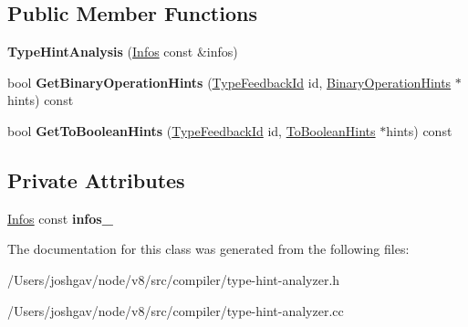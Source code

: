\subsection*{Public Member Functions}
\begin{DoxyCompactItemize}
\item 
{\bfseries Type\+Hint\+Analysis} (\hyperlink{classv8_1_1internal_1_1_zone_map}{Infos} const \&infos)\hypertarget{classv8_1_1internal_1_1compiler_1_1_type_hint_analysis_ae75e34763f2debfd8660e951d06e7c3e}{}\label{classv8_1_1internal_1_1compiler_1_1_type_hint_analysis_ae75e34763f2debfd8660e951d06e7c3e}

\item 
bool {\bfseries Get\+Binary\+Operation\+Hints} (\hyperlink{classv8_1_1internal_1_1_type_feedback_id}{Type\+Feedback\+Id} id, \hyperlink{classv8_1_1internal_1_1compiler_1_1_binary_operation_hints}{Binary\+Operation\+Hints} $\ast$hints) const \hypertarget{classv8_1_1internal_1_1compiler_1_1_type_hint_analysis_aba9dc0a1797e59bc3a49a2a8342f7773}{}\label{classv8_1_1internal_1_1compiler_1_1_type_hint_analysis_aba9dc0a1797e59bc3a49a2a8342f7773}

\item 
bool {\bfseries Get\+To\+Boolean\+Hints} (\hyperlink{classv8_1_1internal_1_1_type_feedback_id}{Type\+Feedback\+Id} id, \hyperlink{classv8_1_1base_1_1_flags}{To\+Boolean\+Hints} $\ast$hints) const \hypertarget{classv8_1_1internal_1_1compiler_1_1_type_hint_analysis_a87b0d0142f4c4946682b68d2e07a7192}{}\label{classv8_1_1internal_1_1compiler_1_1_type_hint_analysis_a87b0d0142f4c4946682b68d2e07a7192}

\end{DoxyCompactItemize}
\subsection*{Private Attributes}
\begin{DoxyCompactItemize}
\item 
\hyperlink{classv8_1_1internal_1_1_zone_map}{Infos} const {\bfseries infos\+\_\+}\hypertarget{classv8_1_1internal_1_1compiler_1_1_type_hint_analysis_aef9ece06d75f44c91e69d6010b52bea3}{}\label{classv8_1_1internal_1_1compiler_1_1_type_hint_analysis_aef9ece06d75f44c91e69d6010b52bea3}

\end{DoxyCompactItemize}


The documentation for this class was generated from the following files\+:\begin{DoxyCompactItemize}
\item 
/\+Users/joshgav/node/v8/src/compiler/type-\/hint-\/analyzer.\+h\item 
/\+Users/joshgav/node/v8/src/compiler/type-\/hint-\/analyzer.\+cc\end{DoxyCompactItemize}
